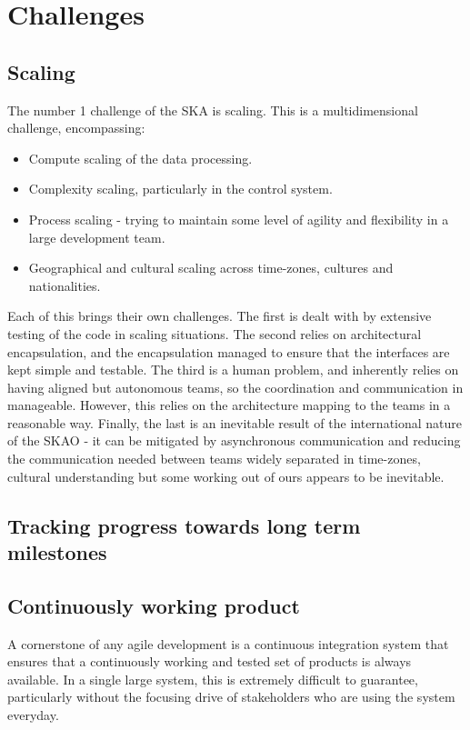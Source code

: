 \documentclass[a4paper,
               biblatex,     %
               keeplastbox,   %
               ]{jacow}
\begin{document}
\section{Challenges}
\subsection{Scaling}
The number 1 challenge of the SKA is scaling. This is a multidimensional challenge, encompassing:
\begin{itemize}
	\item Compute scaling of the data processing.
	\item Complexity scaling, particularly in the control system.
	\item Process scaling - trying to maintain some level of agility and flexibility in a large development team.
	\item Geographical and cultural scaling across time-zones, cultures and nationalities.
\end{itemize}
Each of this brings their own challenges. The first is dealt with by extensive testing of the code in scaling situations. The second relies on architectural encapsulation, and the encapsulation managed to ensure that the interfaces are kept simple and testable. The third is a human problem, and inherently relies on having aligned but autonomous teams, so the coordination and communication in manageable. However, this relies on the architecture mapping to the teams in a reasonable way. Finally, the last is an inevitable result of the international nature of the SKAO - it can be mitigated by asynchronous communication and reducing the communication needed between teams widely separated in time-zones, cultural understanding but some working out of ours appears to be inevitable.

\subsection{Tracking progress towards long term milestones}
\subsection{Continuously working product}
A cornerstone of any agile development is a continuous integration system that ensures that a continuously  working and tested set of products is always available. In a single large system, this is extremely difficult to guarantee, particularly without the focusing drive of stakeholders who are using the system everyday.
\end{document}
